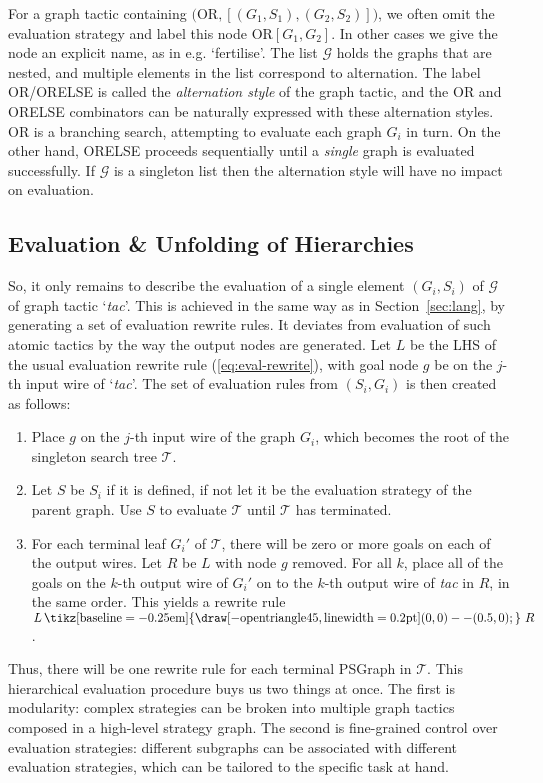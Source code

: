 \documentclass{llncs}
\newcommand{\cmdrewritesto}{\tikz[baseline=-0.25em] { \draw [-open triangle 45, line width=0.2pt] (0,0) -- (0.5,0); }\,}
\DeclareMathOperator{\rewritesto}{\cmdrewritesto}
\begin{document}
For a graph tactic containing $\big(\textrm{OR},[(G_1,S_1),(G_2,S_2)]\big)$, we often omit the evaluation strategy and label this node $\textrm{OR}[G_1,G_2]$. In other cases we give the node an explicit name, as in e.g. `fertilise'.
The list $\mathcal G$ holds the graphs that are nested, and multiple elements in the list correspond to alternation.
The label OR/ORELSE is called the \textit{alternation style} of the graph tactic, and the OR and ORELSE combinators
can be naturally expressed with these alternation styles. OR is a branching search, attempting to evaluate each graph $G_i$ in turn. On the other hand, ORELSE proceeds sequentially until a \textit{single} graph is evaluated successfully. If
 $\mathcal G$ is a singleton list then the alternation style will have no impact on evaluation.
 
 \beforesection
\subsection{Evaluation \& Unfolding of Hierarchies}
\aftersection


So, it only remains to describe the evaluation of a single element $(G_i,S_i)$ of $\mathcal G$ of graph tactic `\textit{tac}'. 
This is achieved in the same
way as in Section~\ref{sec:lang}, by generating a set of evaluation rewrite rules. It deviates from evaluation
of such atomic tactics by the way the output nodes are generated. Let $L$ be the LHS of the usual evaluation rewrite rule (\ref{eq:eval-rewrite}), with goal node $g$ be on the $j$-th input wire of `\textit{tac}'. The set of evaluation rules from $(S_i,G_i)$ is then created as follows:
\begin{enumerate}
  \item Place $g$ on the $j$-th input wire of the graph $G_i$, which becomes the root of the singleton search tree $\mathcal{T}$.
  \item Let $S$ be $S_i$ if it is defined, if not let it be the evaluation strategy of the parent graph. Use $S$ to 
  evaluate $\mathcal{T}$ until $\mathcal{T}$ has terminated. 
\item For each terminal leaf $G_i'$ of $\mathcal{T}$, there will be zero or more goals on each of the output wires. Let $R$ be
  $L$ with node $g$ removed.  For all $k$, place all of the goals on the $k$-th output wire of $G_i'$ on to the $k$-th output wire of \textit{tac} in $R$, in the same order. This yields a rewrite rule $L \rewritesto R$.
\end{enumerate}
Thus, there will be one rewrite rule for each terminal PSGraph in $\mathcal{T}$. 
This hierarchical evaluation procedure buys us two things at once. The first is modularity: complex strategies can be broken into multiple graph tactics composed in a high-level strategy graph. The second is fine-grained control over evaluation strategies: different subgraphs can be associated with different evaluation strategies, which can be tailored to the specific task at hand.
\end{document}
